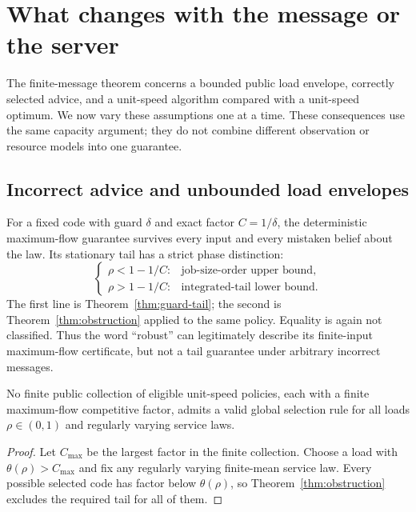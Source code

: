 \section{What changes with the message or the server}\label{sec:boundaries}
The finite-message theorem concerns a bounded public load envelope, correctly selected advice, and a unit-speed algorithm compared with a unit-speed optimum. We now vary these assumptions one at a time. These consequences use the same capacity argument; they do not combine different observation or resource models into one guarantee.

\subsection{Incorrect advice and unbounded load envelopes}
For a fixed code with guard $\delta$ and exact factor $C=1/\delta$, the deterministic maximum-flow guarantee survives every input and every mistaken belief about the law. Its stationary tail has a strict phase distinction:
\begin{equation}\label{eq:wrong-message-phase}
 \begin{cases}
  \rho<1-1/C: &\text{job-size-order upper bound},\\
  \rho>1-1/C: &\text{integrated-tail lower bound}.
 \end{cases}
\end{equation}
The first line is Theorem~\ref{thm:guard-tail}; the second is Theorem~\ref{thm:obstruction} applied to the same policy. Equality is again not classified. Thus the word ``robust'' can legitimately describe its finite-input maximum-flow certificate, but not a tail guarantee under arbitrary incorrect messages.

\begin{corollary}\label{cor:finite-all-loads}
No finite public collection of eligible unit-speed policies, each with a finite maximum-flow competitive factor, admits a valid global selection rule for all loads $\rho\in(0,1)$ and regularly varying service laws.
\end{corollary}
\begin{proof}
Let $C_{\max}$ be the largest factor in the finite collection. Choose a load with $\theta(\rho)>C_{\max}$ and fix any regularly varying finite-mean service law. Every possible selected code has factor below $\theta(\rho)$, so Theorem~\ref{thm:obstruction} excludes the required tail for all of them.
\end{proof}

